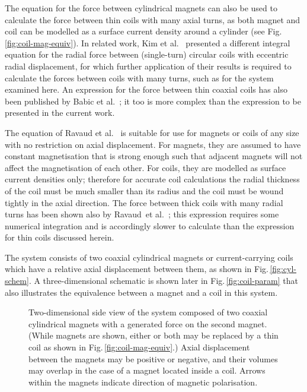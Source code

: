 The equation for the force between cylindrical magnets can also be used to calculate the force between thin coils with many axial turns, as both magnet and coil can be modelled as a surface current density around a cylinder (see Fig.\,\ref{fig:coil-mag-equiv}). In related work, Kim et al.~\cite{kim1996-ietm} presented a different integral equation for the radial force between (single-turn) circular coils with eccentric radial displacement, for which further application of their results is required to calculate the forces between coils with many turns, such as for the system examined here. An expression for the force between thin coaxial coils has also been published by Babic et al.~\cite{babic2008-ietm}; it too is more complex than the expression to be presented in the current work.

The equation of Ravaud et al.~\cite{ravaud2010-ietm} is suitable for use for magnets or coils of any size with no restriction on axial displacement. For magnets, they are assumed to have constant magnetisation that is strong enough such that adjacent magnets will not affect the magnetisation of each other. For coils, they are modelled as surface current densities only; therefore for accurate coil calculations the radial thickness of the coil must be much smaller than its radius and the coil must be wound tightly in the axial direction. The force between thick coils with many radial turns has been shown also by Ravaud~et al.~\cite{ravaud2010-pier}; this expression requires some numerical integration and is accordingly slower to calculate than the expression for thin coils discussed herein.

The system consists of two coaxial cylindrical magnets or current-carrying coils which have a relative axial displacement between them, as shown in Fig.\,\ref{fig:cyl-schem}. 
A three-dimensional schematic is shown later in Fig.\,\ref{fig:coil-param} that also illustrates the equivalence between a magnet and a coil in this system.

\begin{figure}
\centering
{}
\caption{Two-dimensional side view of the system composed of two coaxial cylindrical magnets with a generated force on the second magnet. (While magnets are shown, either or both may be replaced by a thin coil as shown in Fig.\,\ref{fig:coil-mag-equiv}.) Axial displacement between the magnets may be positive or negative, and their volumes may overlap in the case of a magnet located inside a coil. Arrows within the magnets indicate direction of magnetic polarisation.}
\end{figure}

